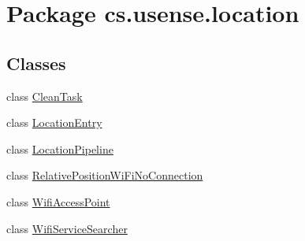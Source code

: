 \hypertarget{namespacecs_1_1usense_1_1location}{}\section{Package cs.\+usense.\+location}
\label{namespacecs_1_1usense_1_1location}
\subsection*{Classes}
\begin{DoxyCompactItemize}
\item 
class \hyperlink{classcs_1_1usense_1_1location_1_1_clean_task}{Clean\+Task}
\item 
class \hyperlink{classcs_1_1usense_1_1location_1_1_location_entry}{Location\+Entry}
\item 
class \hyperlink{classcs_1_1usense_1_1location_1_1_location_pipeline}{Location\+Pipeline}
\item 
class \hyperlink{classcs_1_1usense_1_1location_1_1_relative_position_wi_fi_no_connection}{Relative\+Position\+Wi\+Fi\+No\+Connection}
\item 
class \hyperlink{classcs_1_1usense_1_1location_1_1_wifi_access_point}{Wifi\+Access\+Point}
\item 
class \hyperlink{classcs_1_1usense_1_1location_1_1_wifi_service_searcher}{Wifi\+Service\+Searcher}
\end{DoxyCompactItemize}


